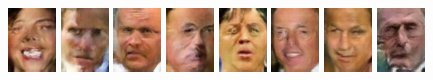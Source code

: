 \begin{figure}[!h]
    \centerline{
        \includegraphics[scale=1]{figures/lfw/appendix3/lfw64x48color_image0016.png}
        \includegraphics[scale=1]{figures/lfw/appendix3/lfw64x48color_image0017.png}
        \includegraphics[scale=1]{figures/lfw/appendix3/lfw64x48color_image0018.png}
        \includegraphics[scale=1]{figures/lfw/appendix3/lfw64x48color_image0019.png}
        \includegraphics[scale=1]{figures/lfw/appendix3/lfw64x48color_image0020.png}
        \includegraphics[scale=1]{figures/lfw/appendix3/lfw64x48color_image0021.png}
        \includegraphics[scale=1]{figures/lfw/appendix3/lfw64x48color_image0022.png}
        \includegraphics[scale=1]{figures/lfw/appendix3/lfw64x48color_image0023.png}
    }
    \vspace{0.1cm}

\end{figure}

